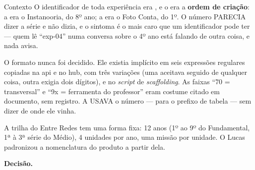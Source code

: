 \begin{especificacao}{Contexto}
O identificador de toda experiência era , e o  era a
\textbf{ordem de criação}: a  era o Instanooria, do 8º ano; a
 era o Foto Conta, do 1º. O número PARECIA dizer a série e não dizia,
e o sintoma é o mais caro que um identificador pode ter --- quem lê
\enquote{exp-04} numa conversa sobre o 4º ano está falando de outra coisa, e
nada avisa.

O formato nunca foi decidido. Ele existia implícito em seis expressões regulares
copiadas na api e no hub, com três variações (uma aceitava  seguido de
qualquer coisa, outra exigia dois dígitos), e no \emph{script} de
\emph{scaffolding}. As faixas \enquote{70 = transversal} e \enquote{9x =
ferramenta do professor} eram costume citado em documento, sem registro. A
 USAVA o número --- para o prefixo de tabela --- sem dizer de onde
ele vinha.

A trilha do Entre Redes tem uma forma fixa: 12 anos (1º ao 9º do Fundamental, 1ª
à 3ª série do Médio), 4 unidades por ano, uma missão por unidade. O Lucas
padronizou a nomenclatura do produto a partir dela.
\end{especificacao}

\textbf{Decisão.}

